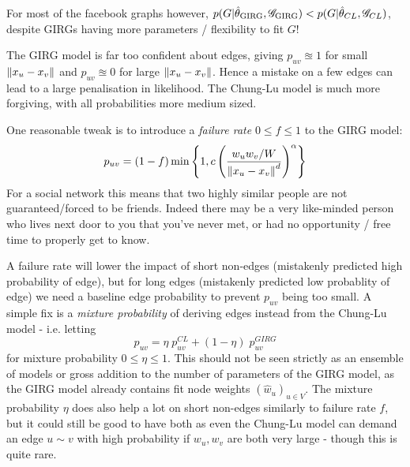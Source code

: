 For most of the facebook graphs however, $p(G | \hat{\theta}_{\mathrm{GIRG}}, \mathscr{G}_{\mathrm{GIRG}}) < p(G | \hat{\theta}_{CL}, \mathscr{G}_{CL})$, despite GIRGs having more parameters / flexibility to fit $G$!

The GIRG model is far too confident about edges, giving $p_{uv} \approxeq 1$ for small $\left\lVert x_u - x_v\right\rVert$ and $p_{uv} \approxeq 0$ for large $\left\lVert x_u - x_v\right\rVert$. Hence a mistake on a few edges can lead to a large penalisation in likelihood. The Chung-Lu model is much more forgiving, with all probabilities more medium sized. 


One reasonable tweak is to introduce a \textit{failure rate} $0 \leq f \leq 1$ to the GIRG model: 
\begin{equation}
  p_{uv} = (1 - f) \min \left \{ 
    1,
    c \left (
        \frac{w_u w_v / W}{\left\lVert x_u - x_v\right\rVert^d}
    \right )^\alpha    
\right \}
\end{equation}
For a social network this means that two highly similar people are not guaranteed/forced to be friends. Indeed there may be a very like-minded person who lives next door to you that you've never met, or had no opportunity / free time to properly get to know.

A failure rate will lower the impact of short non-edges (mistakenly predicted high probability of edge), but for long edges (mistakenly predicted low probablity of edge) we need a baseline edge probability to prevent $p_{uv}$ being too small. A simple fix is a \textit{mixture probability} of deriving edges instead from the Chung-Lu model - i.e. letting
\begin{equation}
  p_{uv} = \eta \; p_{uv}^{CL} + (1 - \eta) \; p_{uv}^{GIRG}
\end{equation}
for mixture probability $0 \leq \eta \leq 1$. This should not be seen strictly as an ensemble of models or gross addition to the number of parameters of the GIRG model, as the GIRG model already contains fit node weights $(\hat{w}_u)_{u \in V}$. The mixture probability $\eta$ does also help a lot on short non-edges similarly to failure rate $f$, but it could still be good to have both as even the Chung-Lu model can demand an edge $u \sim v$ with high probability if $w_u, w_v$ are both very large - though this is quite rare.

